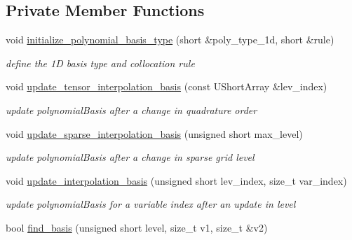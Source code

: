 \subsection*{Private Member Functions}
\begin{DoxyCompactItemize}
\item 
void \hyperlink{classPecos_1_1SharedInterpPolyApproxData_abc1447630ce19662bb54b4935ac871d2}{initialize\+\_\+polynomial\+\_\+basis\+\_\+type} (short \&poly\+\_\+type\+\_\+1d, short \&rule)\label{classPecos_1_1SharedInterpPolyApproxData_abc1447630ce19662bb54b4935ac871d2}

\begin{DoxyCompactList}\small\item\em define the 1D basis type and collocation rule \end{DoxyCompactList}\item 
void \hyperlink{classPecos_1_1SharedInterpPolyApproxData_ac40774432d0aa54bc1a2b24cad8bd5d8}{update\+\_\+tensor\+\_\+interpolation\+\_\+basis} (const U\+Short\+Array \&lev\+\_\+index)\label{classPecos_1_1SharedInterpPolyApproxData_ac40774432d0aa54bc1a2b24cad8bd5d8}

\begin{DoxyCompactList}\small\item\em update polynomial\+Basis after a change in quadrature order \end{DoxyCompactList}\item 
void \hyperlink{classPecos_1_1SharedInterpPolyApproxData_afa692c8fd193ae10e7e992f29bb40882}{update\+\_\+sparse\+\_\+interpolation\+\_\+basis} (unsigned short max\+\_\+level)\label{classPecos_1_1SharedInterpPolyApproxData_afa692c8fd193ae10e7e992f29bb40882}

\begin{DoxyCompactList}\small\item\em update polynomial\+Basis after a change in sparse grid level \end{DoxyCompactList}\item 
void \hyperlink{classPecos_1_1SharedInterpPolyApproxData_a8f3fd2dd21981b9bd4612f2f0f9d6921}{update\+\_\+interpolation\+\_\+basis} (unsigned short lev\+\_\+index, size\+\_\+t var\+\_\+index)\label{classPecos_1_1SharedInterpPolyApproxData_a8f3fd2dd21981b9bd4612f2f0f9d6921}

\begin{DoxyCompactList}\small\item\em update polynomial\+Basis for a variable index after an update in level \end{DoxyCompactList}\item 
bool \hyperlink{classPecos_1_1SharedInterpPolyApproxData_a83795f68a8b6ef46e06513c3ece8902a}{find\+\_\+basis} (unsigned short level, size\+\_\+t v1, size\+\_\+t \&v2)\label{classPecos_1_1SharedInterpPolyApproxData_a83795f68a8b6ef46e06513c3ece8902a}


\end{DoxyCompactItemize}
